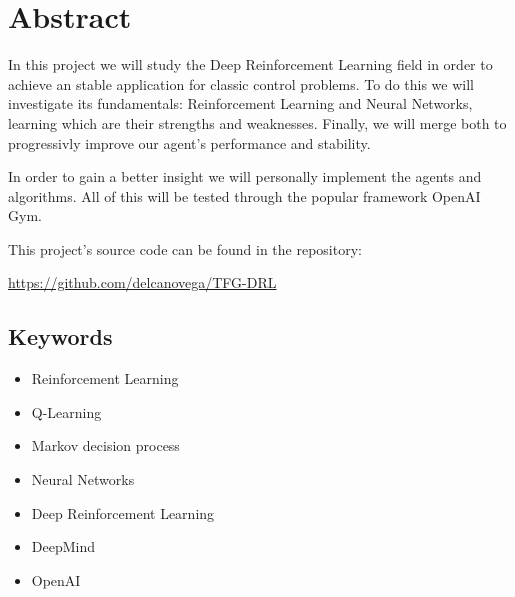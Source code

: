 \chapter*{Abstract}

In this project we will study the Deep Reinforcement Learning field in order to achieve an stable application for classic control problems. To do this we will investigate its fundamentals: Reinforcement Learning and Neural Networks, learning which are their strengths and weaknesses. Finally, we will merge both to progressivly improve our agent's performance and stability.

In order to gain a better insight we will personally implement the agents and algorithms. All of this will be tested through the popular framework OpenAI Gym. 

This project's source code can be found in the repository:

\url{https://github.com/delcanovega/TFG-DRL}

\section*{Keywords}

\begin{itemize}
    \item Reinforcement Learning
    \item Q-Learning
    \item Markov decision process
    \item Neural Networks
    \item Deep Reinforcement Learning
    \item DeepMind 
    \item OpenAI
\end{itemize}
   



